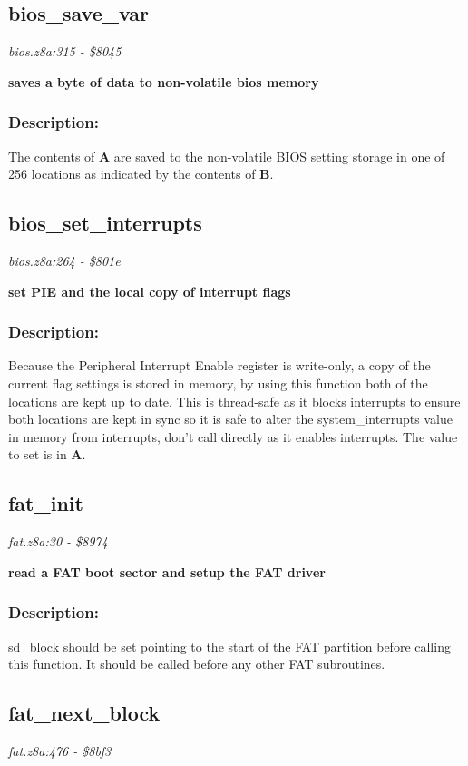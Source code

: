 \subsection{bios\_save\_var}
\textit{bios.z8a:315 - \$8045}

\noindent
\textbf{saves a byte of data to non-volatile bios memory}

\subsubsection{Description:}
 The contents of \textbf{A} are saved to the non-volatile BIOS setting storage in one of 256 locations as indicated by the contents of \textbf{B}.

\subsection{bios\_set\_interrupts}
\textit{bios.z8a:264 - \$801e}

\noindent
\textbf{set PIE and the local copy of interrupt flags}

\subsubsection{Description:}
 Because the Peripheral Interrupt Enable register is write-only, a copy of the current flag settings is stored in memory, by using this function both of the locations are kept up to date.  This is thread-safe as it blocks interrupts to ensure both locations are kept in sync so it is safe to alter the system\_interrupts value in memory from interrupts, don't call directly as it enables interrupts.  The value to set is in \textbf{A}.

\subsection{fat\_init}
\textit{fat.z8a:30 - \$8974}

\noindent
\textbf{read a FAT boot sector and setup the FAT driver}

\subsubsection{Description:}
 sd\_block should be set pointing to the start of the FAT partition before  calling this function.  It should be called before any other FAT subroutines.

\subsection{fat\_next\_block}
\textit{fat.z8a:476 - \$8bf3}

